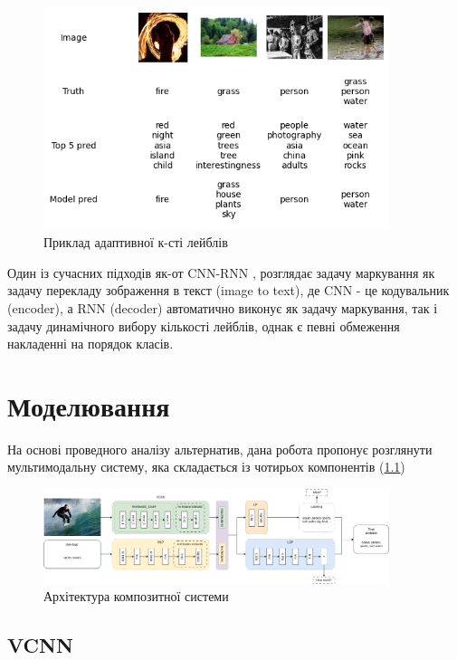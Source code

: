 \documentclass{udstu}
\begin{document}
\begin{figure}[!ht]
	\centering
	\includegraphics[width=0.9\textwidth]{PNG/test-topk}
	\caption{Приклад адаптивної к-сті лейблів}
	\label{figure:test-topk}
\end{figure}

Один із сучасних підходів як-от CNN-RNN \cite{cnn-rnn},
розглядає задачу маркування як задачу перекладу зображення в текст (image to text),
де CNN - це кодувальник (encoder), а RNN (decoder) автоматично виконує як задачу маркування,
так і задачу динамічного вибору кількості лейблів, однак є певні обмеження
накладенні на порядок класів.


\chapter{Моделювання}

На основі проведного аналізу альтернатив, дана робота пропонує розглянути
мультимодальну систему, яка складається із чотирьох компонентів (\figurename{\ref{figure:composite}})

\begin{figure}[!ht]
	\centering
	\includegraphics[width=0.9\textwidth]{PNG/composite}
	\caption{Архітектура композитної системи}
	\label{figure:composite}
\end{figure}

\section{VCNN}
\end{document}

